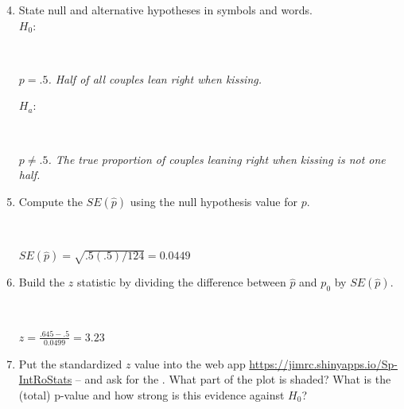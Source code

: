     \begin{enumerate}
\setcounter{enumi}{3}
    \item State null and alternative hypotheses in symbols and
      words.\\
      $H_0:$ 
\begin{students}
    \vspace{1.2cm}    \\
\end{students}
\begin{key} 
{\it $p = .5$.  Half of all couples lean right when kissing.}
\end{key}
$H_a:$
\begin{students}
    \vspace{.7cm}    \\
\end{students}

\begin{key} 
{\it $p \neq .5$.  The true proportion of couples leaning right when
  kissing is not one half.}
\end{key}
\item Compute the $SE(\widehat{p})$ using the null hypothesis value
  for $p$. 
\begin{students}
    \vspace{1cm}    \\
\end{students}

\begin{key} 
{\it $SE(\widehat{p}) = \sqrt{.5(.5)/124} = 0.0449$}
\end{key}

  \item Build the $z$ statistic by dividing the difference between
    $\widehat{p}$ and $p_0$ by $SE(\widehat{p})$. 
\begin{students}
    \vspace{1cm}    \\
\end{students}

\begin{key} 
{\it $z = \frac{.645 - .5}{0.0499} = 3.23$}
\end{key}

  \item Put the standardized $z$ value into the web app 
    \url{https://jimrc.shinyapps.io/Sp-IntRoStats}
     --  and ask for
    the .  What part of the plot is shaded?  What is
    the (total) p-value and how strong is this evidence against $H_0$?  
\begin{students}
    \vspace{1cm}    \\
\end{students}


\end{enumerate}
